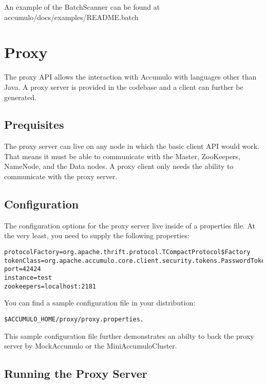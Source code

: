 An example of the BatchScanner can be found at\\
accumulo/docs/examples/README.batch

\section{Proxy}

The proxy API allows the interaction with Accumulo with languages other than Java.
A proxy server is provided in the codebase and a client can further be generated.

\subsection{Prequisites}

The proxy server can live on any node in which the basic client API would work. That
means it must be able to communicate with the Master, ZooKeepers, NameNode, and the
Data nodes. A proxy client only needs the ability to communicate with the proxy server.


\subsection{Configuration}

The configuration options for the proxy server live inside of a properties file. At
the very least, you need to supply the following properties:

\begingroup\fontsize{8pt}{8pt}\selectfont\begin{verbatim}
protocolFactory=org.apache.thrift.protocol.TCompactProtocol$Factory
tokenClass=org.apache.accumulo.core.client.security.tokens.PasswordToken
port=42424
instance=test
zookeepers=localhost:2181
\end{verbatim}\endgroup

You can find a sample configuration file in your distribution:

\begingroup\fontsize{8pt}{8pt}\selectfont\begin{verbatim}
$ACCUMULO_HOME/proxy/proxy.properties.
\end{verbatim}\endgroup

This sample configuration file further demonstrates an abilty to back the proxy server
by MockAccumulo or the MiniAccumuloCluster.

\subsection{Running the Proxy Server}

